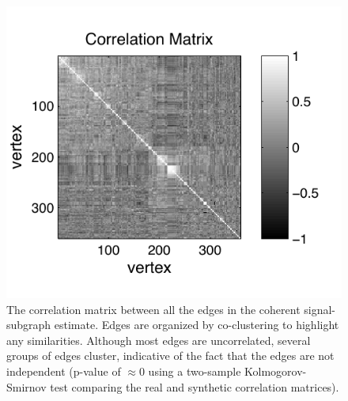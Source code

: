 \documentclass[10pt,journal,cspaper,compsoc]{IEEEtran}
\begin{document}
% 
% 
% 
% 
% 



\begin{figure}[htbp]
	\centering
		\includegraphics[width=1.0\linewidth]{BLSA0317_coclustered_corr.pdf}
	\caption{The correlation matrix between all the edges in the coherent signal-subgraph estimate. Edges are organized by co-clustering to highlight any similarities.  Although most edges are uncorrelated, several groups of edges cluster, indicative of the fact that the edges are not independent (p-value of $\approx 0$ using a two-sample Kolmogorov-Smirnov test comparing the real and synthetic correlation matrices). }
	\label{fig:cov}
\end{figure}
\end{document}
